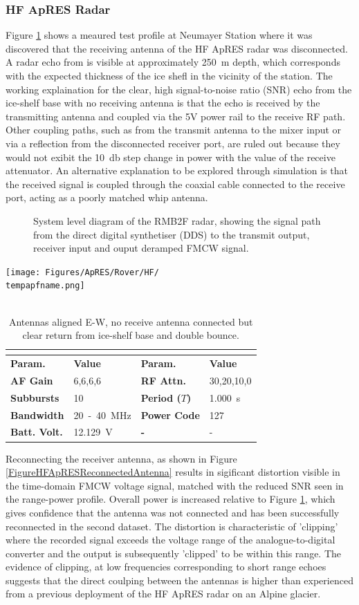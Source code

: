 \documentclass[a4paper,12pt]{article}
\newcommand{\apresdoc}[9]{
    \def\tempapfname{#1}
    \def\tempaploc{#2}
    \def\tempapcom{#3}
    \def\temptimestamp{#4}
    \def\tempafgain{#5}
    \def\temprfattn{#6}
    \def\tempperiod{#7}
    \def\tempflow{#8}
    \def\tempfupp{#9}
    \apresdoccont
}
\newcommand{\apresdoccont}[6]{
  \def\tempnatt{#1}
  \def\tempnchirp{#2}
  \def\tempnsubburst{#3}
  \def\temppowercode{#4}
  \def\tempbattvolt{#5}
  \def\tempaplbl{#6}

  \begin{table}
    \caption{\tempapcom}
    \rowcolors{2}{gray!25}{white}
    \centering
    \texttt{[image: Figures/ApRES/Rover/HF/\\tempapfname.png]}
    \\
    ~\\
    \begin{tabular}{>{\bfseries}l l >{\bfseries}l l}
      \hline
      \rowcolor{gray!50}
      \multicolumn{4}{c}{\textbf{Filename} \tempapfname} \\
      \hline
      Param. & \bfseries Value & Param. & \bfseries Value \\
      AF Gain & \tempafgain &
      RF Attn. & \temprfattn \\
      Subbursts & \tempnsubburst &
      Period ($T$) & \tempperiod~s \\
      Bandwidth & \tempflow~-~\tempfupp~MHz &
      Power Code & \temppowercode \\
      Batt. Volt. & \tempbattvolt~V &
      - & - \\
      \hline
    \end{tabular}
    \label{\tempaplbl}
  \end{table}
}
\begin{document}
\subsubsection*{HF ApRES Radar}
Figure \ref{FigureHFApRESNoReceiveAntenna} shows a meaured test profile at
Neumayer Station where it was discovered that the receiving antenna of the HF
ApRES radar was disconnected.  A radar echo from is visible at approximately 
\SI{250}{\metre} depth, which corresponds with the expected thickness of the ice
shefl in the vicinity of the station.  The working explaination for the clear,
high signal-to-noise ratio (SNR) echo from the ice-shelf base with no receiving
antenna is that the echo is received by the transmitting antenna and coupled via
the 5V power rail to the receive RF path.  Other coupling paths, such as from the
transmit antenna to the mixer input or via a reflection from the disconnected
receiver port, are ruled out because they would not exibit the \SI{10}{\decibel}
step change in power with the value of the receive attenuator.  An alternative
explanation to be explored through simulation is that the received signal is
coupled through the coaxial cable connected to the receive port, acting as a
poorly matched whip antenna.

\begin{figure}[h]
  \centering
  
  \caption{
    System level diagram of the RMB2F radar, showing the signal path from the
    direct digital synthetiser (DDS) to the transmit output, receiver input and
    ouput deramped FMCW signal.}
  \label{FigureHFApRESRadarArchitecture}
\end{figure}

\apresdoc
{2021-12-28\_213752.dat}
{Neumayer III}
{Antennas aligned E-W, no receive antenna connected but clear return from
ice-shelf base and double bounce.}
{2021-12-28 21:37:53.000}
{6,6,6,6}
{30,20,10,0}
{1.000}
{20}
{40}
{4}
{40}
{10}
{127}
{12.129}
{FigureHFApRESNoReceiveAntenna}

Reconnecting the receiver antenna, as shown in Figure
\ref{FigureHFApRESReconnectedAntenna} results in sigificant distortion visible
in the time-domain FMCW voltage signal, matched with the reduced SNR seen in the
range-power profile.  Overall power is increased relative to Figure
\ref{FigureHFApRESNoReceiveAntenna}, which gives confidence that the antenna was
not connected and has been successfully reconnected in the second dataset.  The
distortion is characteristic of 'clipping' where the recorded signal exceeds the
voltage range of the analogue-to-digital converter and the output is
subsequently 'clipped' to be within this range.  The evidence of clipping, at
low frequencies corresponding to short range echoes suggests that the direct
coulping between the antennas is higher than experienced from a previous
deployment of the HF ApRES radar on an Alpine glacier. 
\end{document}
